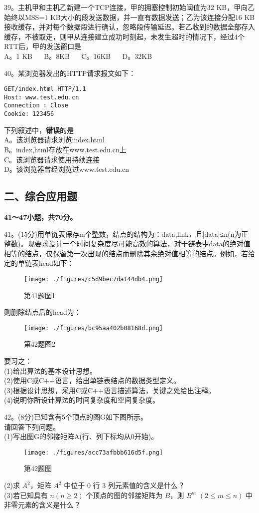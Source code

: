 39。主机甲和主机乙新建一个TCP连接，甲的拥塞控制初始阈值为32 KB，甲向乙始终以MSS=1 KB大小的段发送数据，并一直有数据发送；乙为该连接分配16 KB接收缓存，并对每个数据段进行确认，忽略段传输延迟。若乙收到的数据全部存入缓存，不被取走，则甲从连接建立成功时刻起，未发生超时的情况下，经过4个RTT后，甲的发送窗口是 \\
A。1 KB $\quad$ B。8KB $\quad$ C。16KB $\quad$ D。32KB

40。某浏览器发出的HTTP请求报文如下： \\
\begin{lstlisting}[language=none]
GET/index.html HTTP/1.1
Host: www.test.edu.cn
Connection : Close
Cookie: 123456
\end{lstlisting}
下列叙述中，\textbf{错误}的是 \\
A。该浏览器请求浏览index.html \\
B。index,html存放在www.test.edu.cn上 \\
C。该浏览器请求使用持续连接 \\
D。该浏览器曾经浏览过www.test.edu.cn

\subsection{二、综合应用题}
\textbf{41～47小题，共70分。}

41。(15分)用单链表保存m个整数，结点的结构为：data,link，且|data|≤n(n为正整数)。现要求设计一个时间复杂度尽可能高效的算法，对于链表中data的绝对值相等的结点，仅保留第一次出现的结点而删除其余绝对值相等的结点。例如，若给定的单链表head如下：
\begin{figure}[ht]
\centering
\texttt{[image: ./figures/c5d9bec7da144db4.png]}
\caption{第41题图1} \label{fig_CSN15_3}
\end{figure}
则删除结点后的head为：
\begin{figure}[ht]
\centering
\texttt{[image: ./figures/bc95aa402b08168d.png]}
\caption{第42题图2} \label{fig_CSN15_4}
\end{figure}
要习之： \\
(1)给出算法的基本设计思想。 \\
(2)使用C或C++语言，给出单链表结点的数据类型定义。 \\
(3)根据设计思想，采用C或C++语言描述算法，关键之处给出注释。 \\
(4)说明你所设计算法的时间复杂度和空间复杂度。

42。(8分)已知含有5个顶点的图G如下图所示。 \\
请回答下列问题。 \\
(1)写出图G的邻接矩阵A(行、列下标均从0开始)。
\begin{figure}[ht]
\centering
\texttt{[image: ./figures/acc73afbbb616d5f.png]}
\caption{第42题图} \label{fig_CSN15_5}
\end{figure}
(2)求 $A^2$，矩阵 $A^2$ 中位于 $0$ 行 $3$ 列元素值的含义是什么？ \\
(3)若已知具有 $n(n\geqslant2)$ 个顶点的图的邻接矩阵为 $B$，则 $B^m$ $(2\leqslant m\leqslant n)$ 中非零元素的含义是什么？

